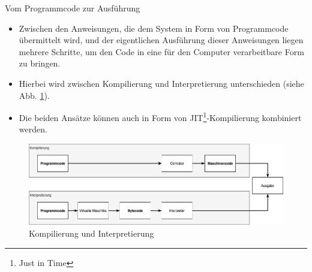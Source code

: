 \begin{frame}{Vom Programmcode zur Ausführung}
        \begin{itemize}
            \item Zwischen den Anweisungen, die dem System in Form von Programmcode übermittelt wird, und der eigentlichen Ausführung dieser Anweisungen liegen mehrere Schritte, um den Code in eine für den Computer verarbeitbare Form zu bringen.
            \item Hierbei wird zwischen \alert{Kompilierung} und \alert{Interpretierung} unterschieden (siehe Abb. \ref{fig:compilation_interpretation}).
            \item Die beiden Ansätze können auch in Form von JIT\footnote{Just in Time}-Kompilierung kombiniert werden.
        \end{itemize}
         
        
        \begin{figure}
            \centering
            \includegraphics[width=\linewidth,height=0.3\textheight,keepaspectratio]{chapters/02_computer_science/figures/CompilationVSInterpretation.png}
            \caption{Kompilierung und Interpretierung}
            \label{fig:compilation_interpretation}
        \end{figure}
    \end{frame}

    
    
    
    
